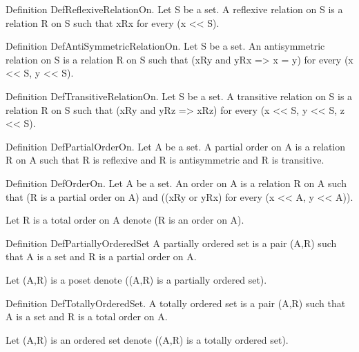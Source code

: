 \begin{forthel}
Definition DefReflexiveRelationOn. 
    Let S be a set.
    A reflexive relation on S is a relation R on S such that
    xRx for every (x << S).

Definition DefAntiSymmetricRelationOn. 
    Let S be a set.
    An antisymmetric relation on S is a relation R on S such that
    (xRy and yRx => x = y) for every (x << S, y << S).

Definition DefTransitiveRelationOn.
    Let S be a set.
    A transitive relation on S is a relation R on S such that
    (xRy and yRz => xRz) for every (x << S, y << S, z << S).

Definition DefPartialOrderOn.
    Let A be a set.
    A partial order on A is a relation R on A such that
    R is reflexive and R is antisymmetric and R is transitive.

Definition DefOrderOn.
    Let A be a set.
    An order on A is a relation R on A such that
    (R is a partial order on A) and ((xRy or yRx) for every (x << A, y << A)).

Let R is a total order on A denote (R is an order on A).

Definition DefPartiallyOrderedSet
    A partially ordered set is a pair (A,R) such that A is a set and R is a partial order on A.

Let (A,R) is a poset denote ((A,R) is a partially ordered set).

Definition DefTotallyOrderedSet.
    A totally ordered set is a pair (A,R) such that A is a set and R is a total order on A.

Let (A,R) is an ordered set denote ((A,R) is a totally ordered set).
\end{forthel}

